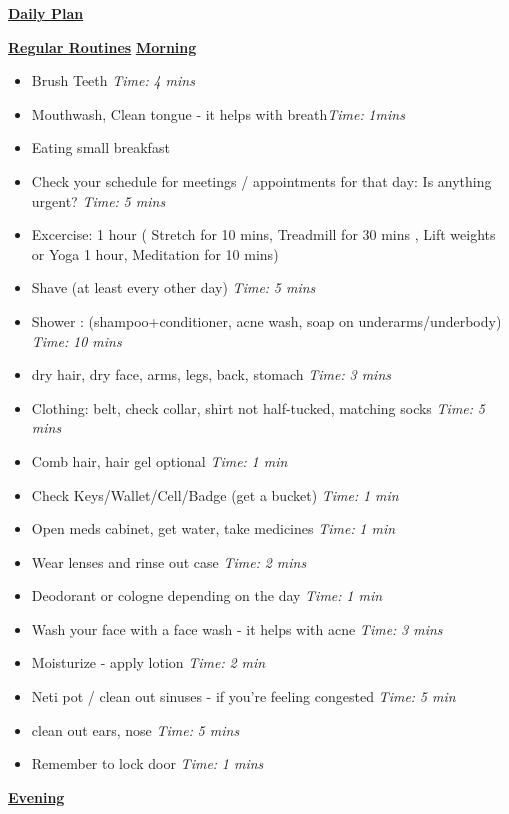 \documentclass[serif,mathserif,final]{beamer}
\newcommand{\timeEst}[1]{\textit{Time:} \textit{#1}}
\begin{document}
\begin{frame}{}
\begin{columns}[t]
\begin{column}{0.27\linewidth}{\textbf{\underline{Daily Plan}}}
\begin{block}{\small \textbf{\underline{Regular Routines}} }
\underline{\textbf{Morning}}
\begin{itemize}
\item \tiny Brush Teeth \timeEst{4 mins}
\item \tiny Mouthwash, Clean tongue - it helps with breath\timeEst{1mins} 
\item \tiny Eating small breakfast
\item \tiny Check your schedule for meetings / appointments for that day: Is anything urgent? \timeEst{5 mins}
\item \tiny Excercise: 1 hour ( Stretch for 10 mins, Treadmill for 30 mins , Lift weights or Yoga 1 hour, Meditation for 10 mins)
\item \tiny Shave (at least every other day) \timeEst{5 mins}
\item \tiny Shower : (shampoo+conditioner, acne wash,  soap on underarms/underbody)
\timeEst{10 mins}
\item \tiny dry hair, dry face, arms, legs, back, stomach \timeEst{3 mins}
\item \tiny Clothing: belt, check collar, shirt not half-tucked, matching socks \timeEst{5 mins}
\item \tiny Comb hair, hair gel optional \timeEst{ 1 min}
\item \tiny Check Keys/Wallet/Cell/Badge (get a bucket) \timeEst{1 min}
\item \tiny Open meds cabinet, get water, take medicines \timeEst{1 min}
\item \tiny Wear lenses and rinse out case \timeEst{ 2 mins}
\item \tiny Deodorant or cologne depending on the day \timeEst{1 min}
\item \tiny Wash your face with a face wash - it helps with acne \timeEst{3 mins}
\item \tiny Moisturize - apply lotion \timeEst{ 2 min}
\item \tiny Neti pot / clean out sinuses - if you’re feeling congested \timeEst{5 min}
\item \tiny clean out ears, nose \timeEst{5 mins}
\item \tiny Remember to lock door \timeEst{1 mins}
\end{itemize}

\underline{\textbf{Evening}}


\end{block}
\end{column}
\end{columns}
\end{frame}
\end{document}
